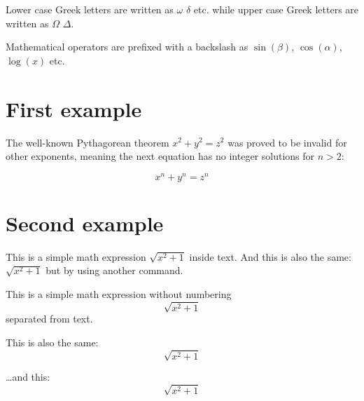 \documentclass[a4paper,11pt]{article}
\begin{document}
Lower case Greek letters are written as $\omega$ $\delta$ etc. while upper case Greek letters are written as $\Omega$ $\Delta$.

Mathematical operators are prefixed with a backslash as $\sin(\beta)$, $\cos(\alpha)$, $\log(x)$ etc.


\section{First example}

The well-known Pythagorean theorem \(x^2 + y^2 = z^2\) was proved to be invalid for other exponents, meaning the next equation has no integer solutions for \(n>2\):

\[ x^n + y^n = z^n \]

\section{Second example}

This is a simple math expression \(\sqrt{x^2+1}\) inside text. 
And this is also the same: 
\begin{math}
\sqrt{x^2+1}
\end{math}
but by using another command.

This is a simple math expression without numbering
\[\sqrt{x^2+1}\] 
separated from text.

This is also the same:
\begin{displaymath}
\sqrt{x^2+1}
\end{displaymath}

\ldots and this:
\begin{equation*}
\sqrt{x^2+1}
\end{equation*}
















\end{document}
